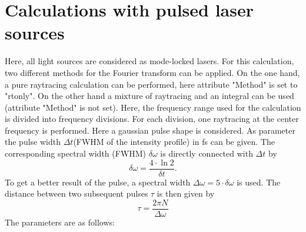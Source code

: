 \documentclass[a4paper,html,11pt,openany]{book}
\begin{document}
 \section{Calculations with pulsed laser sources}
 Here, all light sources are considered as mode-locked lasers.  For this calculation, two different methods for the Fourier transform can be applied. On the one hand, a pure raytracing calculation can be performed, here attribute "Method" is set to "rtonly". On the other hand a mixture of raytracing and an integral can be used (attribute "Method" is not set). Here, the frequency range used for the calculation is divided into frequency divisions. For each division, one raytracing at the center frequency is performed. Here a gaussian pulse shape is considered. As parameter the pulse width $\Delta t$(FWHM of the intensity profile) in \si{\femto\second} can be given. The corresponding spectral width (FWHM) $\delta \omega$ is directly connected with $\Delta t$ by
 \begin{equation}
  \delta \omega=\frac{4\cdot\ln 2}{\delta t}.
 \end{equation}
 To get a better result of the pulse, a spectral width $\Delta \omega = 5 \cdot \delta \omega$ is used. The distance between two subsequent pulses $\tau$ is then given by
 \begin{equation}
   \tau=\frac{2\pi N}{\Delta \omega}
 \end{equation}
The parameters are as follows: 
 \vspace{1em}
\end{document}
